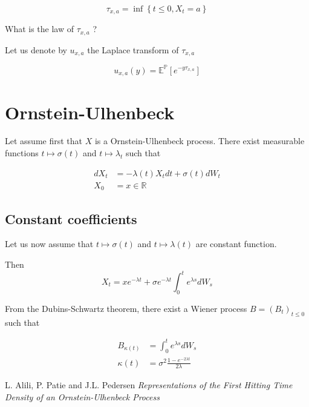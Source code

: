 \documentclass{article}
\begin{document}
\begin{equation}
	\tau_{x,a} = \inf\left\{t \leq 0, X_t = a \right\}
\end{equation}

\noindent What is the law of $\tau_{x,a}$ ?

\noindent Let us denote by $u_{x,a}$ the Laplace transform of $\tau_{x,a}$

\begin{equation}
	u_{x,a}(y) = \mathbb{E}^\mathbb{P}\left[e^{-y\tau_{x,a}}\right]
\end{equation}

\section{Ornstein-Ulhenbeck}

Let assume first that $X$ is a Ornstein-Ulhenbeck process. There exist measurable functions $t \mapsto \sigma(t)$ and $t \mapsto \lambda_t$ such that

\begin{equation}
\begin{aligned}
	dX_t &= -\lambda(t) X_t dt + \sigma(t) dW_t\\
	X_0 &= x \in \mathbb{R}
\end{aligned}
\end{equation}

\subsection{Constant coefficients}
Let us now assume that $t \mapsto \sigma(t)$ and $t \mapsto \lambda(t)$ are constant function.

Then
\begin{equation}
	X_t = x e^{-\lambda t} + \sigma e^{-\lambda t} \int_0^t e^{\lambda s} dW_s 
\end{equation}

\noindent From the Dubins-Schwartz theorem, there exist a Wiener process $B = (B_t)_{t \leq 0}$ such that 

\begin{equation}
\begin{aligned}
	B_{\kappa(t)} &= \int_0^t e^{\lambda s} dW_s \\
	\kappa(t) &= \sigma^2 \frac{1 - e^{-2 \lambda t}}{2 \lambda}
\end{aligned}
\end{equation}

\begin{thebibliography}{9}

  L. Alili, P. Patie and J.L. Pedersen
  \emph{Representations of the First Hitting Time Density of an Ornstein-Ulhenbeck Process}

\end{thebibliography}
\end{document}
